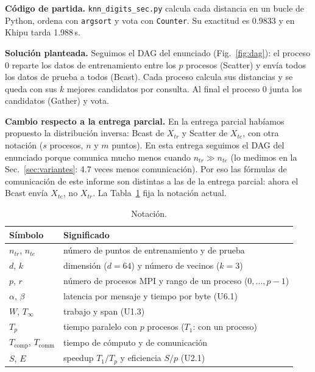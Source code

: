 \documentclass[11pt,a4paper]{article}
\newcommand{\ntr}{n_{tr}}
\newcommand{\nte}{n_{te}}
\newcommand{\tsub}[1]{T_{\mathrm{#1}}}
\begin{document}
\textbf{Código de partida.} \texttt{knn\_digits\_sec.py} calcula cada distancia en un bucle de Python, ordena con \texttt{argsort} y vota con \texttt{Counter}. Su exactitud es 0.9833 y en Khipu tarda 1.988\,s.

\textbf{Solución planteada.} Seguimos el DAG del enunciado (Fig.~\ref{fig:dag}): el proceso 0 reparte los datos de entrenamiento entre los $p$ procesos (Scatter) y envía todos los datos de prueba a todos (Bcast). Cada proceso calcula sus distancias y se queda con sus $k$ mejores candidatos por consulta. Al final el proceso 0 junta los candidatos (Gather) y vota.

\textbf{Cambio respecto a la entrega parcial.} En la entrega parcial habíamos propuesto la distribución inversa: Bcast de $X_{tr}$ y Scatter de $X_{te}$, con otra notación ($s$ procesos, $n$ y $m$ puntos). En esta entrega seguimos el DAG del enunciado porque comunica mucho menos cuando $\ntr\gg\nte$ (lo medimos en la Sec.~\ref{sec:variantes}: 4.7 veces menos comunicación). Por eso las fórmulas de comunicación de este informe son distintas a las de la entrega parcial: ahora el Bcast envía $X_{te}$, no $X_{tr}$. La Tabla~\ref{tab:notacion} fija la notación actual.

\begin{table}[htbp]
\centering\small
\caption{Notación.}\label{tab:notacion}
\begin{tabular}{@{}ll@{}}\toprule
Símbolo & Significado\\\midrule
$\ntr$, $\nte$ & número de puntos de entrenamiento y de prueba\\
$d$, $k$ & dimensión ($d=64$) y número de vecinos ($k=3$)\\
$p$, $r$ & número de procesos MPI y rango de un proceso ($0,\dots,p-1$)\\
$\alpha$, $\beta$ & latencia por mensaje y tiempo por byte (U6.1)\\
$W$, $T_\infty$ & trabajo y span (U1.3)\\
$T_p$ & tiempo paralelo con $p$ procesos ($T_1$: con un proceso)\\
$\tsub{comp}$, $\tsub{comm}$ & tiempo de cómputo y de comunicación\\
$S$, $E$ & speedup $T_1/T_p$ y eficiencia $S/p$ (U2.1)\\\bottomrule
\end{tabular}
\end{table}
\end{document}
